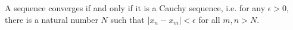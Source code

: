 A sequence converges if and only if it is a Cauchy sequence, 
i.e. for any $ \epsilon > 0$, there is a natural number $N$ such that $ |x_n - x_m| < \epsilon $ for all $m,n>N$.
  